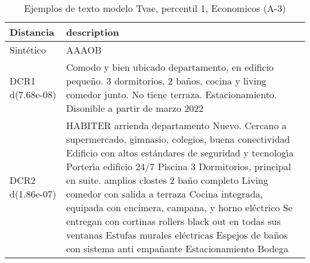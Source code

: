 \begin{table}[H]
\centering
\fontsize{10}{14}\selectfont
\caption{Ejemplos de texto modelo Tvae, percentil 1, Economicos (A-3)}
\label{table-example-economicos-a-3-tvae-1p-text}
\begin{tabular}{|l|m{35em}|}
\hline
\rowcolor[gray]{0.8}
Distancia & description \\
\hline Sintético & AAAOB \\
\hline DCR1 d(7.68e-08) & Comodo y bien ubicado departamento, en edificio peque\~no. 3 dormitorios, 2 ba\~nos, cocina y living comedor junto. No tiene terraza. Estacionamiento. Disonible a partir de marzo 2022 \\
\hline DCR2 d(1.86e-07) & HABITER arrienda departamento Nuevo.  Cercano a supermercado, gimnasio, colegios, buena conectividad  Edificio con altos est\'andares de seguridad y tecnolog{\'\i}a Porter{\'\i}a edificio 24/7 Piscina  3 Dormitorios, principal en suite. amplios clostes 2 ba\~no completo Living comedor con salida a terraza Cocina integrada, equipada con encimera, campana, y horno el\'ectrico   Se entregan con cortinas rollers black out en todas sus ventanas Estufas murales el\'ectricas Espejos de ba\~nos con sistema anti empa\~nante Estacionamiento  Bodega \\
\hline
\end{tabular}
\end{table}
